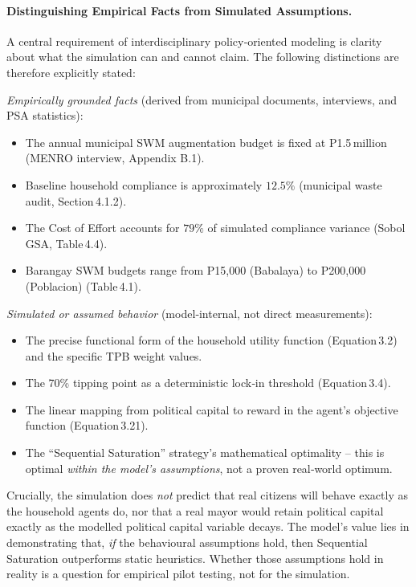 \paragraph{Distinguishing Empirical Facts from Simulated Assumptions.}
A central requirement of interdisciplinary policy‑oriented modeling is clarity about what the simulation can and cannot claim. The following distinctions are therefore explicitly stated:

\emph{Empirically grounded facts} (derived from municipal documents, interviews, and PSA statistics):
\begin{itemize}
    \item The annual municipal SWM augmentation budget is fixed at P1.5 million (MENRO interview, Appendix B.1).
    \item Baseline household compliance is approximately \(12.5\%\) (municipal waste audit, Section 4.1.2).
    \item The Cost of Effort accounts for \(79\%\) of simulated compliance variance (Sobol GSA, Table 4.4).
    \item Barangay SWM budgets range from P15,000 (Babalaya) to P200,000 (Poblacion) (Table 4.1).
\end{itemize}

\emph{Simulated or assumed behavior} (model‑internal, not direct measurements):
\begin{itemize}
    \item The precise functional form of the household utility function (Equation 3.2) and the specific TPB weight values.
    \item The 70\% tipping point as a deterministic lock‑in threshold (Equation 3.4).
    \item The linear mapping from political capital to reward in the agent’s objective function (Equation 3.21).
    \item The “Sequential Saturation” strategy’s mathematical optimality – this is optimal \emph{within the model’s assumptions}, not a proven real‑world optimum.
\end{itemize}

Crucially, the simulation does \emph{not} predict that real citizens will behave exactly as the household agents do, nor that a real mayor would retain political capital exactly as the modelled political capital variable decays. The model’s value lies in demonstrating that, \emph{if} the behavioural assumptions hold, then Sequential Saturation outperforms static heuristics. Whether those assumptions hold in reality is a question for empirical pilot testing, not for the simulation.

